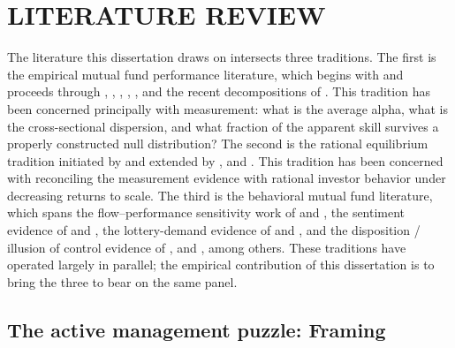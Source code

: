 \documentclass[12pt, oneside]{report}
\begin{document}
\chapter{LITERATURE REVIEW}
\label{ch:literature}

\noindent The literature this dissertation draws on intersects three
traditions. The first is the empirical mutual fund performance literature,
which begins with \textcite{Jensen1968} and proceeds through
\textcite{Carhart1997}, \textcite{Wermers2000}, \textcite{KosowskiTimmermannWermersWhite2006},
\textcite{FamaFrench2010}, \textcite{BarrasScailletWermers2010}, and the
recent decompositions of \textcite{BarrasGagliardiniScaillet2022}. This
tradition has been concerned principally with measurement: what is the
average alpha, what is the cross-sectional dispersion, and what fraction of
the apparent skill survives a properly constructed null distribution? The
second is the rational equilibrium tradition initiated by
\textcite{BerkGreen2004} and extended by
\textcite{PastorStambaugh2012}, \textcite{PastorStambaughTaylor2015} and 
\textcite{BerkVanBinsbergen2015,BerkVanBinsbergen2016}. This tradition has
been concerned with reconciling the measurement evidence with rational
investor behavior under decreasing returns to scale. The third is the
behavioral mutual fund literature, which spans the flow--performance
sensitivity work of \textcite{SirriTufano1998} and \textcite{ChevalierEllison1997},
the sentiment evidence of \textcite{BakerWurgler2006,BakerWurgler2007} and
\textcite{StambaughYuYuan2012}, the lottery-demand evidence of
\textcite{Kumar2009} and \textcite{BaliCakiciWhitelaw2011}, and the
disposition / illusion of control evidence of \textcite{ShefrinStatman1985},
\textcite{Odean1998} and \textcite{Langer1975}, among others. These traditions have
operated largely in parallel; the empirical contribution of this dissertation
is to bring the three to bear on the same panel.

\section{The active management puzzle: Framing}
\label{sec:puzzle_framing}
\end{document}
